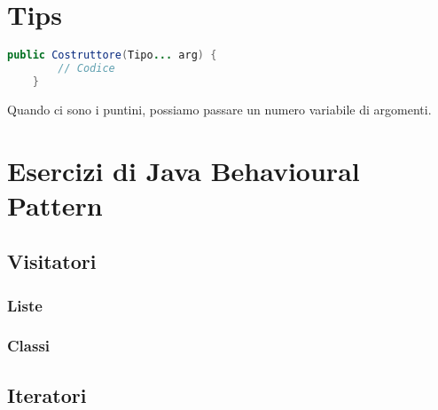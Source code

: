 \documentclass[10pt]{article}
\begin{document}
\section{Tips}
\begin{lstlisting}[language=Java]
    public Costruttore(Tipo... arg) {
        // Codice
    }
\end{lstlisting}
Quando ci sono i puntini, possiamo passare un numero variabile di argomenti.

\section{Esercizi di Java Behavioural Pattern}

    \subsection{Visitatori}

        \subsubsection{Liste}
            
            
            
            
        
        \subsubsection{Classi}
            
            
            
            

    \subsection{Iteratori}
    
\end{document}
